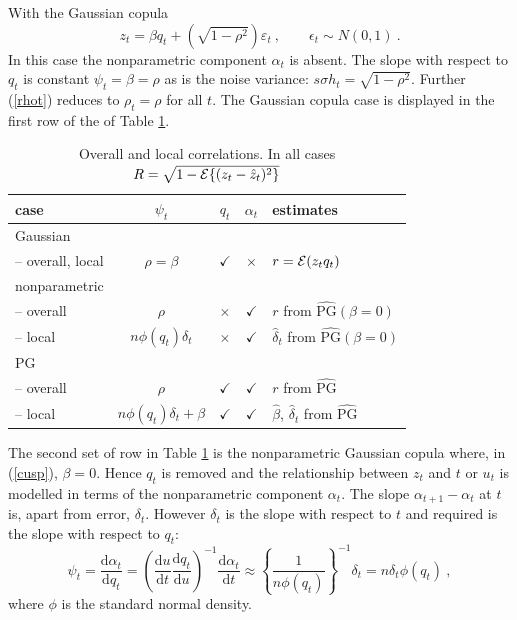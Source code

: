 \documentclass[authoryear]{elsarticle}
\newcommand{\eps}{\epsilon}
\newcommand{\Ex}{{\cal E}}
\newcommand{\de}{\mathrm{d}}
\newcommand{\eref}[1]{(\ref{#1})}
\newcommand{\tref}[1]{Table \ref{#1}}
\newcommand{\cq}{\ , \qquad}
\newcommand{\be}[1]{\begin{equation}\label{#1}}
\newcommand{\ee}{\end{equation}}
\begin{document}
With the Gaussian copula 
$$
z_t=\beta q_t + (\sqrt{1-\rho^2})\varepsilon_t\cq \eps_t\sim N(0,1)\ .
$$
In this  case the nonparametric component $\alpha_t$ is absent.  The slope with respect to $q_t$ is constant $\psi_t=\beta=\rho$ as is the noise variance: $s\sigma h_t=\sqrt{1-\rho^2}$.  Further  \eref{rhot} reduces to $\rho_t=\rho$ for all $t$.  The Gaussian copula case is displayed in the first row of the of \tref{corr}.

\begin{table}[htdp]
\caption{Overall and local correlations.  In all cases $R=\sqrt{1-\Ex\{(z_t-\hat z_t)^2\}}$}\label{corr}
\begin{center}
\begin{tabular}{l|ccc|l}
\hline
case & $\psi_t$ & $q_t$ & $\alpha_t$ & estimates\\
\hline\hline
Gaussian & & & \\
-- overall,  local &$\rho=\beta$ &$\checkmark$& $\times$ & $r=\Ex(z_tq_t)$ \\
\hline
nonparametric & & & \\
-- overall &$\rho$ &$\times$ & $\checkmark$& $r$ from $\widehat{\mathrm{PG}}(\beta=0)$\\
-- local  &$n\phi(q_t)\delta_t$ &$\times$ & $\checkmark$& $\hat\delta_t$ from $\widehat{\mathrm{PG}}(\beta=0)$\\
\hline
PG & & & \\
-- overall & $\rho$ & $\checkmark$& $\checkmark$& $r$ from $\widehat{\mathrm{PG}}$ \\
-- local & $n\phi(q_t)\delta_t+\beta$&$\checkmark$& $\checkmark$&$\hat\beta$, $\hat\delta_t$ from $\widehat{\mathrm{PG}}$  \\
\hline\hline
\end{tabular}
\end{center}
\end{table}%

The second set of row in \tref{corr} is the nonparametric Gaussian copula where, in \eref{cusp},  $\beta=0$.  Hence $q_t$ is removed and  the relationship between $z_t$ and $t$ or $u_t$ is  modelled in terms of the  nonparametric component $\alpha_t$.  The   slope $\alpha_{t+1}-\alpha_t$  at  $t$ is, apart from error,
$\delta_t$.   However $\delta_t$ is the slope with respect to $t$ and required is the slope with respect to $q_t$:
\be{normslope}
\psi_t=\frac{\de \alpha_t}{\de q_t} = \left( \frac{\de u}{\de t}\frac{\de q_t}{\de u}\right)^{-1}\frac{\de \alpha_t}{\de t}  \approx
\left\{\frac{1}{n\phi(q_t)}\right\}^{-1}\delta_t  = n\delta_t\phi(q_t)\ ,
\ee
where $\phi$ is the standard normal density.    
\end{document}
